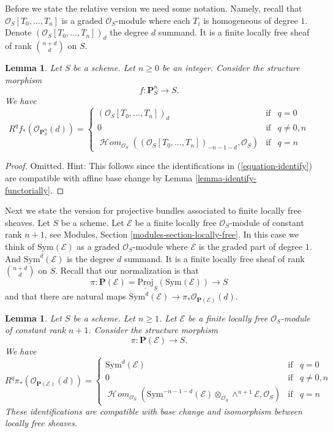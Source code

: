 \documentclass{stacks-project}
\theoremstyle{plain}
\newtheorem{lemma}[subsection]{Lemma}
\theoremstyle{definition}
\theoremstyle{remark}
\numberwithin{equation}{subsection}
\def\SheafHom{\mathop{\mathcal{H}\!\mathit{om}}\nolimits}
\begin{document}
\noindent
Before we state the relative version we need some notation.
Namely, recall that $\mathcal{O}_S[T_0, \ldots, T_n]$ is a graded
$\mathcal{O}_S$-module where each $T_i$ is homogeneous of degree $1$.
Denote $(\mathcal{O}_S[T_0, \ldots, T_n])_d$ the degree $d$ summand.
It is a finite locally free sheaf of rank $\binom{n + d}{d}$ on $S$.

\begin{lemma}
\label{lemma-cohomology-projective-space-over-base}
Let $S$ be a scheme.
Let $n \geq 0$ be an integer.
Consider the structure morphism
$$
f : \mathbf{P}^n_S \longrightarrow S.
$$
We have
$$
R^qf_*(\mathcal{O}_{\mathbf{P}^n_S}(d)) =
\left\{
\begin{matrix}
(\mathcal{O}_S[T_0, \ldots, T_n])_d & \text{if} & q = 0 \\
0 & \text{if} & q \not = 0, n \\
\SheafHom_{\mathcal{O}_S}(
(\mathcal{O}_S[T_0, \ldots, T_n])_{- n - 1 - d}, \mathcal{O}_S)
& \text{if} & q = n
\end{matrix}
\right.
$$
\end{lemma}

\begin{proof}
Omitted. Hint: This follows since the identifications in
(\ref{equation-identify}) are compatible with affine base change
by Lemma \ref{lemma-identify-functorially}.
\end{proof}

\noindent
Next we state the version for projective bundles associated to finite locally
free sheaves. Let $S$ be a scheme. Let $\mathcal{E}$ be a finite locally
free $\mathcal{O}_S$-module of constant rank $n + 1$, see
Modules, Section \ref{modules-section-locally-free}.
In this case we think of $\text{Sym}(\mathcal{E})$ as a graded
$\mathcal{O}_S$-module where $\mathcal{E}$ is the graded part of degree $1$.
And $\text{Sym}^d(\mathcal{E})$ is the degree $d$ summand.
It is a finite locally free sheaf of rank $\binom{n + d}{d}$ on $S$.
Recall that our normalization is that
$$
\pi :
\mathbf{P}(\mathcal{E})
=
\underline{\text{Proj}}_S(\text{Sym}(\mathcal{E}))
\longrightarrow
S
$$
and that there are natural maps
$\text{Sym}^d(\mathcal{E}) \to \pi_*\mathcal{O}_{\mathbf{P}(\mathcal{E})}(d)$.

\begin{lemma}
\label{lemma-cohomology-projective-bundle}
Let $S$ be a scheme. Let $n \geq 1$.
Let $\mathcal{E}$ be a finite locally
free $\mathcal{O}_S$-module of constant rank $n + 1$.
Consider the structure morphism
$$
\pi : \mathbf{P}(\mathcal{E}) \longrightarrow S.
$$
We have
$$
R^q\pi_*(\mathcal{O}_{\mathbf{P}(\mathcal{E})}(d)) =
\left\{
\begin{matrix}
\text{Sym}^d(\mathcal{E}) & \text{if} & q = 0 \\
0 & \text{if} & q \not = 0, n \\
\SheafHom_{\mathcal{O}_S}(
\text{Sym}^{- n - 1 - d}(\mathcal{E})
\otimes_{\mathcal{O}_S}
\wedge^{n + 1}\mathcal{E},
\mathcal{O}_S)
& \text{if} & q = n
\end{matrix}
\right.
$$
These identifications are compatible with base change and
isomorphism between locally free sheaves.
\end{lemma}
\end{document}
